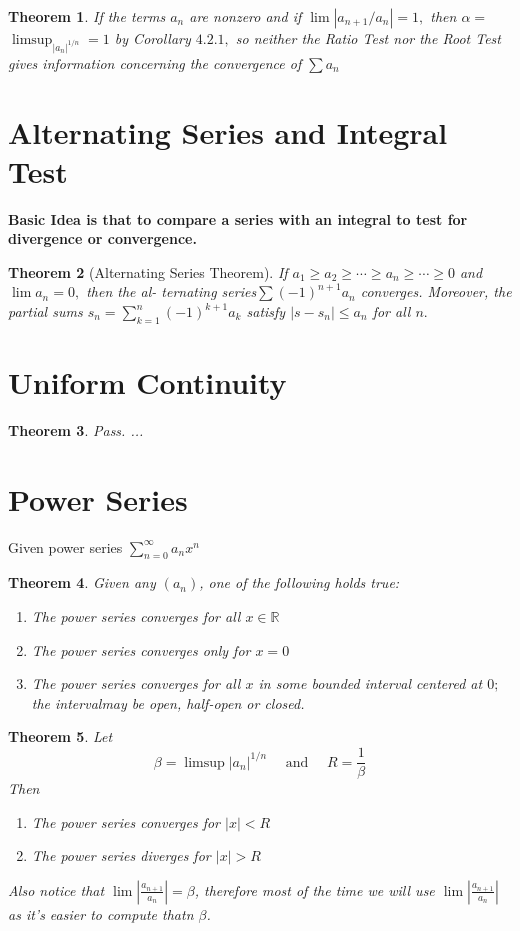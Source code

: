 \documentclass[12pt]{article}
\newtheorem{theorem}{Theorem}[section]
\begin{document}
\begin{theorem}
	If the terms $a _ { n }$ are nonzero and if $\lim \left| a _ { n + 1 } / a _ { n } \right| = 1 ,$ then $\alpha =$
	$\limsup _ { \left| a _ { n } \right| ^ { 1 / n } } = 1$ by Corollary $4.2.1 ,$ so neither the Ratio Test nor
	the Root Test gives information concerning the convergence of $\sum a _ { n }$
\end{theorem}

\section{Alternating Series and Integral Test}
\textbf{Basic Idea is that to compare a series with an integral to test for divergence or convergence.}

\begin{theorem}[Alternating Series Theorem]
	If $a _ { 1 } \geq a _ { 2 } \geq \cdots \geq a _ { n } \geq \cdots \geq 0$ and $\lim a _ { n } = 0 ,$ then the al-
	ternating series$\sum ( - 1 ) ^ { n + 1 } a _ { n }$ converges. Moreover, the partial sums
	$s _ { n } = \sum _ { k = 1 } ^ { n } ( - 1 ) ^ { k + 1 } a _ { k }$ satisfy $\left| s - s _ { n } \right| \leq a _ { n }$ for all $n .$
\end{theorem}

\section{Uniform Continuity}
\begin{theorem}
	Pass. ...
\end{theorem}
\section{Power Series}
Given power series $\sum _ { n = 0 } ^ { \infty } a _ { n } x ^ { n }$
\begin{theorem}
Given any $(a_n)$, one of the following holds true:
\begin{enumerate}
	\item The power series converges for all $x \in \mathbb{R}$
	\item The power series converges only for $x = 0$
	\item The power series converges for all $x$ in some bounded interval centered at $0 ;$ the intervalmay be open, half-open or closed.
\end{enumerate}
\end{theorem}

\begin{theorem}
	Let $$
	\beta = \limsup \left| a _ { n } \right| ^ { 1 / n } \quad \text { and } \quad R = \frac { 1 } { \beta }
	$$
	Then
	\begin{enumerate}
		\item The power series converges for  $|x| < R$
		\item The power series diverges for $|x| > R$
	\end{enumerate}
	
	Also notice that $\lim \left| \frac { a _ { n + 1 } } { a _ { n } } \right| = \beta$, therefore most of the time we will use $\lim \left| \frac { a _ { n + 1 } } { a _ { n } } \right|$ as it's easier to compute thatn $\beta$.
\end{theorem}
\end{document}
